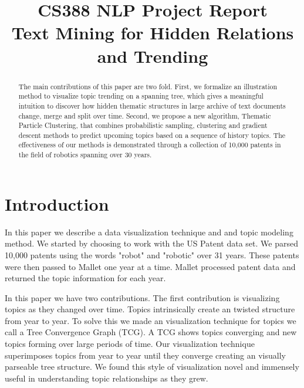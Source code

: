 \documentclass[conference]{IEEEtran}
\begin{document}
\title{\large{CS388 NLP Project Report}\\ \huge{Text Mining for Hidden Relations and Trending}}

\author{
\and
{}
}
\maketitle
\onehalfspace
\begin{abstract}
The main contributions of this paper are two fold. First, we formalize an illustration method to visualize topic trending on a spanning tree, which gives a meaningful intuition to discover how hidden thematic structures in large archive of text documents change, merge and split over time. Second, we propose a new algorithm, Thematic Particle Clustering, that combines probabilistic sampling, clustering and gradient descent methods to predict upcoming topics based on a sequence of history topics. The effectiveness of our methods is demonstrated through a collection of 10,000 patents in the field of robotics spanning over 30 years.
\end{abstract}

\section{Introduction}
In this paper we describe a data visualization technique and and topic modeling method. We started by choosing to work with the US Patent data set. We parsed 10,000 patents using the words "robot" and "robotic" over 31 years. These patents were then passed to Mallet \cite{mallet} one year at a time. Mallet processed patent data and returned the topic information for each year.

In this paper we have two contributions. The first contribution is visualizing topics as they changed over time. Topics intrinsically create an twisted structure from year to year. To solve this we made an visualization technique for topics we call a Tree Convergence Graph (TCG). A TCG shows topics converging and new topics forming over large periods of time. Our visualization technique superimposes topics from year to year until they converge creating an visually parseable tree structure. We found this style of visualization novel and immensely useful in understanding topic relationships as they grew. 
\end{document}
